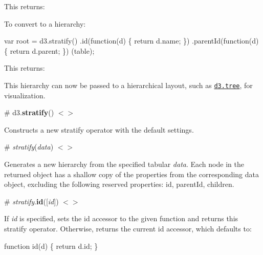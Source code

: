This returns\+:


\begin{DoxyCode}
\end{DoxyCode}


To convert to a hierarchy\+:


\begin{DoxyCode}
var root = d3.stratify()
    .id(function(d) \{ return d.name; \})
    .parentId(function(d) \{ return d.parent; \})
    (table);
\end{DoxyCode}


This returns\+:

\href{https://tonicdev.com/mbostock/56fed33d8630b01300f72daa}{\tt }

This hierarchy can now be passed to a hierarchical layout, such as \href{#_tree}{\tt d3.\+tree}, for visualization.

\label{_stratify}%
\# d3.{\bfseries stratify}() \href{https://github.com/d3/d3-hierarchy/blob/master/src/stratify.js}{\tt $<$$>$}

Constructs a new stratify operator with the default settings.

\label{__stratify}%
\# {\itshape stratify}({\itshape data}) \href{https://github.com/d3/d3-hierarchy/blob/master/src/stratify.js#L20}{\tt $<$$>$}

Generates a new hierarchy from the specified tabular {\itshape data}. Each node in the returned object has a shallow copy of the properties from the corresponding data object, excluding the following reserved properties\+: id, parent\+Id, children.

\label{_stratify_id}%
\# {\itshape stratify}.{\bfseries id}(\mbox{[}{\itshape id}\mbox{]}) \href{https://github.com/d3/d3-hierarchy/blob/master/src/stratify.js#L64}{\tt $<$$>$}

If {\itshape id} is specified, sets the id accessor to the given function and returns this stratify operator. Otherwise, returns the current id accessor, which defaults to\+:


\begin{DoxyCode}
function id(d) \{
  return d.id;
\}
\end{DoxyCode}


